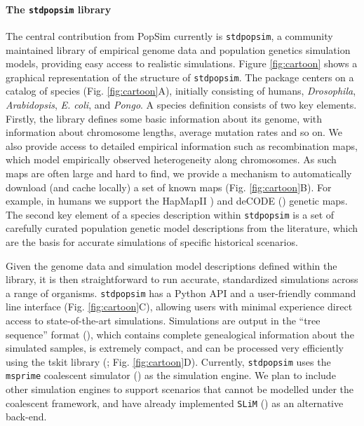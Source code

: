 \documentclass[12pt,halfline,a4paper]{ouparticle}
\newcommand{\stdpopsim}{\texttt{stdpopsim}\xspace}
\begin{document}
\paragraph{The \stdpopsim library}
The central contribution from PopSim currently is \stdpopsim, a community
maintained library of empirical genome data and population genetics simulation
models, providing easy access to realistic simulations. Figure \ref{fig:cartoon} shows a graphical
representation of the structure of \stdpopsim. The package centers
on a catalog of species (Fig. \ref{fig:cartoon}A), initially consisting of humans, \emph{Drosophila},
\emph{Arabidopsis}, \emph{E. coli}, and \emph{Pongo}. A species definition consists
of two key elements.  Firstly, the library defines
some basic information about its genome, with information about chromosome
lengths, average mutation rates and so on. We also provide access to detailed
empirical information such as recombination maps, which model empirically
observed heterogeneity along chromosomes. As such maps are often large and hard
to find, we provide a mechanism to automatically download (and cache locally) a
set of known maps (Fig. \ref{fig:cartoon}B). For example, in humans we support the HapMapII
\cite{international2007second}) and
deCODE (\cite{kong2010fine}) genetic maps. The second key element of a species description
within \stdpopsim is a set of carefully curated population genetic model
descriptions from the literature, which are the basis for accurate simulations
of specific historical scenarios.

Given the genome data and simulation model descriptions defined within the
library, it is then straightforward to run accurate, standardized simulations
across a range of organisms. \stdpopsim has a Python API and a user-friendly
command line interface (Fig. \ref{fig:cartoon}C), allowing users with minimal experience direct access to
state-of-the-art simulations. Simulations are output in the “tree sequence”
format (\cite{kelleher2016efficient,kelleher2018efficient,kelleher2019inferring}), which
contains complete genealogical information about the simulated samples, is
extremely compact, and can be processed very efficiently using the tskit library
(\cite{kelleher2016efficient,kelleher2018efficient}; Fig. \ref{fig:cartoon}D). Currently,
\stdpopsim uses the  \texttt{msprime} coalescent simulator (\cite{kelleher2016efficient})
as the simulation engine. We plan to include other simulation
engines to support scenarios that cannot be modelled under the coalescent framework,
and have already implemented \texttt{SLiM} (\cite{haller2019slim}) as
an alternative back-end.
\end{document}
